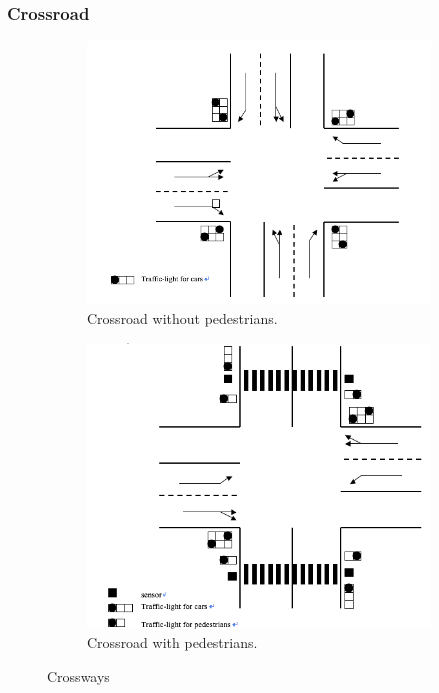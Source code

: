 \subsubsection{Crossroad}
\begin{figure}
	\centering
	\begin{subfigure}{.5\textwidth}
		\centering
		\includegraphics[width=\linewidth]{figures/crosswaya.png}
		\caption{Crossroad without pedestrians.}
		\label{fig:crossa}
	\end{subfigure}%
	\begin{subfigure}{.5\textwidth}
		\centering
		\includegraphics[width=\linewidth]{figures/crosswayb.png}
		\caption{Crossroad with pedestrians.}
		\label{fig:crossb}
	\end{subfigure}
	\caption{Crossways}
	\label{fig:cross}
\end{figure}

